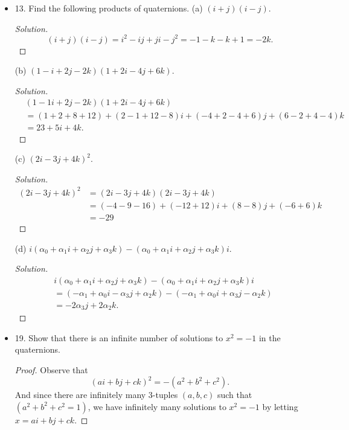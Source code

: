 \begin{itemize}
\begin{proof}
	Assume $n$ is not prime. Then there exists some $a, b < n$, where  $a, b > 1$ such that $n = ab$. But then $ab = 0$ modulo $n$, but $a, b \neq 0$. Hence $\mathbb{Z}_n$ is not a domain. Hence it cannot be a field.
\end{proof}

	\item 13. Find the following products of quaternions.
(a) $(i+j)(i-j)$.
\begin{proof}[Solution]
	\[
		(i+j)(i-j) = i^2 - ij + ji - j^2 = -1 - k - k + 1 = -2k
	.\] 
\end{proof}

(b) $(1-i+2 j-2 k)(1+2 i-4 j+6 k)$.
\begin{proof}[Solution]
	\begin{align*}
		&(1 -1 i +2 j -2 k)
		(1 +2 i -4 j +6 k)\\
		&=(1+2+8+12) + (2-1+12-8)i + (-4+2-4+6)j + (6-2+4-4)k\\
		&= 23 + 5i + 4k
	.\end{align*} 
\end{proof}

(c) $(2 i-3 j+4 k)^2$.
\begin{proof}[Solution]
	\begin{align*}
		(2 i-3 j+4 k)^2
		&= (2 i-3 j+4 k)(2 i-3 j+4 k) \\
		&= (-4-9-16)+(-12+12)i+(8-8)j+(-6+6)k \\
		&= -29
	\end{align*}
\end{proof}

(d) $i\left(\alpha_0+\alpha_1 i+\alpha_2 j+\alpha_3 k\right)-\left(\alpha_0+\alpha_1 i+\alpha_2 j+\alpha_3 k\right) i$.
\begin{proof}[Solution]
	\begin{align*}
		& i\left(\alpha_0+\alpha_1 i+\alpha_2 j+\alpha_3 k\right)-\left(\alpha_0+\alpha_1 i+\alpha_2 j+\alpha_3 k\right) i\\
		&= \left( -\alpha_1 + \alpha_0 i -\alpha_3 j + \alpha_2 k \right) - \left( -\alpha_1 + \alpha_0 i + \alpha_3 j - \alpha_2 k \right)  \\
		&= -2\alpha_3 j + 2 \alpha_2 k
	.\end{align*}
\end{proof}

\item 19. Show that there is an infinite number of solutions to $x^2=-1$ in the quaternions.
\begin{proof}
	Observe that 
	\[
		(ai + bj + ck)^2 = -(a^2 + b^2 + c^2)
	.\] 
	And since there are infinitely many 3-tuples $(a,b,c)$ such that $(a^2 + b^2 + c^2 = 1)$, we have infinitely many solutions to $x^2 = -1$ by letting $x = ai + bj + ck $.
\end{proof}


\end{itemize}

